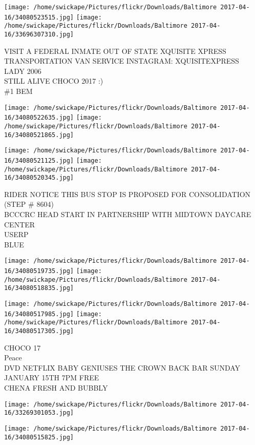 \documentclass[10pt,letterpaper]{article}
\begin{document}
\texttt{[image: /home/swickape/Pictures/flickr/Downloads/Baltimore 2017-04-16/34080523515.jpg]}
\texttt{[image: /home/swickape/Pictures/flickr/Downloads/Baltimore 2017-04-16/33696307310.jpg]}

VISIT A FEDERAL INMATE OUT OF STATE XQUISITE XPRESS TRANSPORTATION VAN SERVICE  INSTAGRAM: XQUISITEXPRESS\\
LADY 2006\\
STILL ALIVE CHOCO 2017 :)\\
\#1 BEM\\
\pagebreak

\texttt{[image: /home/swickape/Pictures/flickr/Downloads/Baltimore 2017-04-16/34080522635.jpg]}
\texttt{[image: /home/swickape/Pictures/flickr/Downloads/Baltimore 2017-04-16/34080521865.jpg]}

\texttt{[image: /home/swickape/Pictures/flickr/Downloads/Baltimore 2017-04-16/34080521125.jpg]}
\texttt{[image: /home/swickape/Pictures/flickr/Downloads/Baltimore 2017-04-16/34080520345.jpg]}

RIDER NOTICE THIS BUS STOP IS PROPOSED FOR CONSOLIDATION (STEP \# 8604)\\
BCCCRC HEAD START IN PARTNERSHIP WITH MIDTOWN DAYCARE CENTER\\
USERP\\
BLUE\\
\pagebreak

\texttt{[image: /home/swickape/Pictures/flickr/Downloads/Baltimore 2017-04-16/34080519735.jpg]}
\texttt{[image: /home/swickape/Pictures/flickr/Downloads/Baltimore 2017-04-16/34080518835.jpg]}

\texttt{[image: /home/swickape/Pictures/flickr/Downloads/Baltimore 2017-04-16/34080517985.jpg]}
\texttt{[image: /home/swickape/Pictures/flickr/Downloads/Baltimore 2017-04-16/34080517305.jpg]}

CHOCO 17\\
Peace\\
DVD NETFLIX BABY GENIUSES THE CROWN BACK BAR SUNDAY JANUARY 15TH 7PM FREE\\
CHENA FRESH AND BUBBLY\\
\pagebreak

\texttt{[image: /home/swickape/Pictures/flickr/Downloads/Baltimore 2017-04-16/33269301053.jpg]}

\vspace{0.25in}
\texttt{[image: /home/swickape/Pictures/flickr/Downloads/Baltimore 2017-04-16/34080515825.jpg]}
\end{document}
